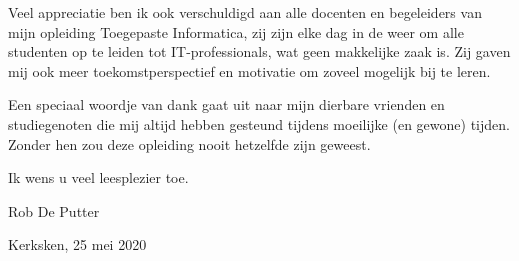 \newpage
Veel appreciatie ben ik ook verschuldigd aan alle docenten en begeleiders van mijn opleiding Toegepaste Informatica, zij zijn elke dag in de weer om alle studenten op te leiden tot IT-professionals, wat geen makkelijke zaak is. Zij gaven mij ook meer toekomstperspectief en motivatie om zoveel mogelijk bij te leren.

Een speciaal woordje van dank gaat uit naar mijn dierbare vrienden en studiegenoten die mij altijd hebben gesteund tijdens moeilijke (en gewone) tijden. Zonder hen zou deze opleiding nooit hetzelfde zijn geweest.

Ik wens u veel leesplezier toe.

Rob De Putter

Kerksken, 25 mei 2020


